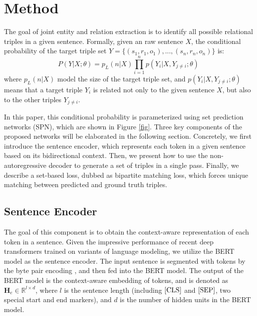 \documentclass[letterpaper]{article} \usepackage{aaai21}  \usepackage{times}  \usepackage{helvet} \usepackage{courier}  \usepackage[hyphens]{url}  \usepackage{graphicx} \usepackage{amsfonts,amssymb}
\begin{document}
\section{Method}

The goal of joint entity and relation extraction is to identify all possible relational triples in a given sentence. Formally, given an raw sentence $X$, the conditional probability of the target triple set $Y=\{(s_1, r_1, o_1),..., (s_n, r_n, o_n)\}$ is: 
\begin{equation}
    P(Y|X;\theta) = p_L(n|X)\prod \limits_{i=1}^n p(Y_i|X, Y_{j \neq i}; \theta)
\label{equ1}
\end{equation}
where $p_L(n|X)$ model the size of the target triple set, and $p(Y_i|X, Y_{j \neq i}; \theta)$ means that a target triple $Y_i$ is related not only to the given sentence $X$, but also to the other triples $Y_{j \neq i}$.

In this paper, this conditional probability is parameterized using set prediction networks (SPN), which are shown in Figure \ref{fig}. Three key components of the proposed networks will be elaborated in the following section. Concretely, we first introduce the sentence encoder, which represents each token in a given sentence based on its bidirectional context. Then, we present how to use the non-autoregressive decoder to generate a set of triples in a single pass. Finally, we describe a set-based loss, dubbed as bipartite matching loss,  which forces unique matching between predicted and ground truth triples.





\subsection{Sentence Encoder}
\label{encoder}
The goal of this component is to obtain the context-aware representation of each token in a sentence. Given the impressive performance of recent deep transformers \cite{vaswani2017attention} trained on variants of language modeling, we utilize the BERT model \cite{devlin2018bert} as the sentence encoder.
The input sentence is segmented with tokens by the byte pair encoding \cite{sennrich-etal-2016-neural}, and then fed into the BERT model. The output of the BERT model is the context-aware embedding of tokens, and is denoted as $\mathbf{H}_e \in \mathbb{R}^{l \times d}$, where $l$ is the sentence length (including ${\rm [CLS]}$ and ${\rm [SEP]}$, two special start and end markers), and $d$ is the number of hidden units in the BERT model.
\end{document}
